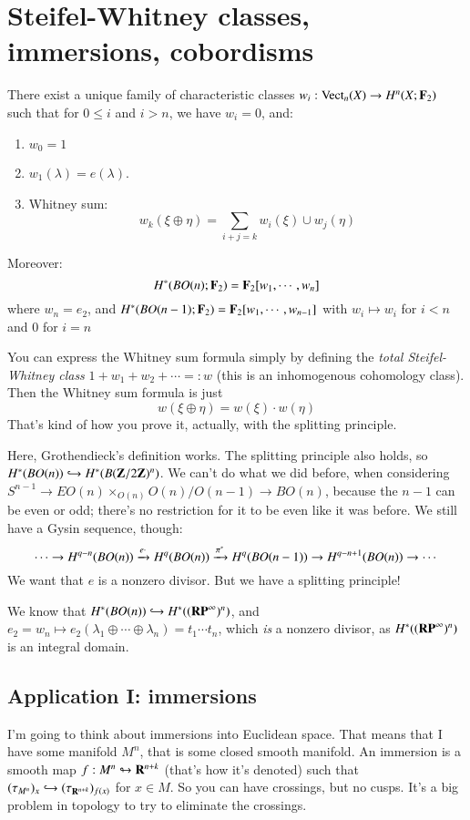 \section{Steifel-Whitney classes, immersions, cobordisms}
\begin{theorem}
    There exist a unique family of characteristic classes $w_i:\operatorname{Vect}_n(X) \to H^n(X;\mathbf F_2)$ such that for $0\leq i$ and $i>n$, we have $w_i=0$, and:
    \begin{enumerate}
	\item $w_0 = 1$
	\item $w_1(\lambda) = e(\lambda)$.
	\item Whitney sum:
	    \begin{equation*}
		w_k(\xi\oplus\eta) = \sum_{i+j=k} w_i(\xi)\cup w_j(\eta)
	    \end{equation*}
    \end{enumerate}
    Moreover:
    $$
    H^\ast(BO(n);\mathbf F_2) = \mathbf F_2[w_1,\cdots,w_n]
    $$
    where $w_n = e_2$, and $H^\ast(BO(n-1);\mathbf F_2) = \mathbf F_2[w_1,\cdots,w_{n-1}]$ with $w_i\mapsto w_i$ for $i<n$ and $0$ for $i=n$
\end{theorem}
\begin{remark}
    You can express the Whitney sum formula simply by defining the \emph{total Steifel-Whitney class} $1 + w_1 + w_2 + \cdots=:w$ (this is an inhomogenous cohomology class).
    Then the Whitney sum formula is just
    $$
    w(\xi\oplus\eta) = w(\xi)\cdot w(\eta)
    $$
    That's kind of how you prove it, actually, with the splitting principle.
\end{remark}
Here, Grothendieck's definition works.
The splitting principle also holds, so $H^\ast(BO(n))\hookrightarrow H^\ast(B(\mathbf Z/2\mathbf Z)^n)$.
We can't do what we did before, when considering $S^{n-1} \to EO(n)\times_{O(n)} O(n)/O(n-1)\to BO(n)$, because the $n-1$ can be even or odd; there's no restriction for it to be even like it was before.
We still have a Gysin sequence, though:
$$
\cdots\to H^{q-n}(BO(n))\xrightarrow{{e\cdot}} H^q(BO(n)) \xrightarrow{{\pi^\ast}} H^q(BO(n-1)) \to H^{q-n+1}(BO(n))\to\cdots
$$
We want that $e$ is a nonzero divisor.
But we have a splitting principle!

We know that $H^\ast(BO(n)) \hookrightarrow H^\ast((\mathbf{RP}^\infty)^n)$, and $e_2=w_n\mapsto e_2(\lambda_1\oplus\cdots\oplus\lambda_n) = t_1\cdots t_n$, which \emph{is} a nonzero divisor, as $H^\ast((\mathbf{RP}^\infty)^n)$ is an integral domain.
\subsection{Application I: immersions}
I'm going to think about immersions into Euclidean space.
That means that I have some manifold $M^n$, that is some closed smooth manifold.
An immersion is a smooth map $f:M^n\looparrowright \mathbf R^{n+k}$ (that's how it's denoted) such that $(\tau_{M^n})_x \hookrightarrow (\tau_{\mathbf R^{n+k}})_{f(x)}$ for $x\in M$.
So you can have crossings, but no cusps.
It's a big problem in topology to try to eliminate the crossings.

